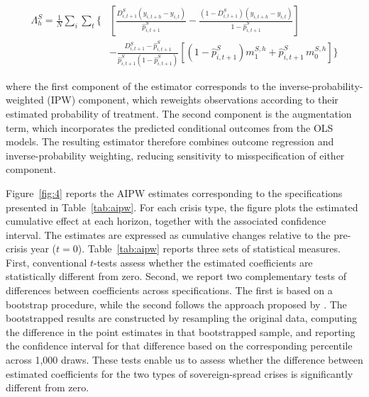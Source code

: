 \documentclass[12pt]{article}
\begin{document}
\begin{equation}
\label{eq:4}
\begin{split}
\Lambda_h^S = \frac{1}{N}\sum_{i}\sum_{t} \Biggl\{
&\left[ \frac{D_{i,t+1}^S\left(y_{i,t+h} - y_{i,t}\right)}{\widehat{p}^S_{i,t+1}}
     - \frac{\left(1-D_{i,t+1}^S\right)\left(y_{i,t+h} - y_{i,t}\right)}{1-\widehat{p}^S_{i,t+1}} \right] \\
&- \frac{D_{i,t+1}^S - \widehat{p}^S_{i,t+1}}{\widehat{p}^S_{i,t+1}\left(1-\widehat{p}^S_{i,t+1}\right)}
\left[ \left(1-\widehat{p}^S_{i,t+1}\right)m_1^{S,h} + \widehat{p}^S_{i,t+1}\,m_0^{S,h} \right]
\Biggr\}
\end{split}
\end{equation}

\noindent where the first component of the estimator corresponds to the
inverse-probability-weighted (IPW) component, which reweights
observations according to their estimated probability of treatment. The
second component is the augmentation term, which incorporates the
predicted conditional outcomes from the OLS models. The resulting
estimator therefore combines outcome regression and inverse-probability
weighting, reducing sensitivity to misspecification of either component.

Figure~\ref{fig:4} reports the AIPW estimates corresponding to the
specifications presented in Table~\ref{tab:aipw}. For each crisis type,
the figure plots the estimated cumulative effect at each horizon,
together with the associated confidence interval. The estimates are
expressed as cumulative changes relative to the pre-crisis year ($t=0$).
Table~\ref{tab:aipw} reports three sets of statistical measures. First,
conventional $t$-tests assess whether the estimated coefficients are
statistically different from zero. Second, we report two complementary
tests of differences between coefficients across specifications. The
first is based on a bootstrap procedure, while the second follows the
approach proposed by \citet{clogg1995statistical}. The bootstrapped results are
constructed by resampling the original data, computing the difference in
the point estimates in that bootstrapped sample, and reporting the
confidence interval for that difference based on the corresponding
percentile across 1,000 draws. These tests enable us to assess whether the
difference between estimated coefficients for the two types of
sovereign-spread crises is significantly different from zero.
\end{document}
